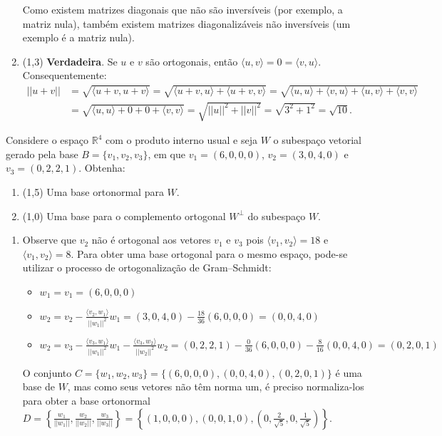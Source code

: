\documentclass[12pt,a4paper]{article}
\newcommand{\norm}[1]{\left|\left|{#1}\right|\right|}
\newcommand*\R{\mathbb{R}}
\begin{document}
\begin{ExerciseList}
\begin{enumerate}
Como existem matrizes diagonais que não são inversíveis (por exemplo, a matriz nula), também existem matrizes diagonalizáveis não inversíveis (um exemplo é a matriz nula).
\item (1,3) \textbf{Verdadeira}. Se $u$ e $v$ são ortogonais, então $\langle u, v \rangle = 0 = \langle v, u \rangle$. Consequentemente:
\begin{align*}
    \norm{u+v}
& = \sqrt{ \langle u+v, u+v \rangle }
  = \sqrt{ \langle u+v, u \rangle + \langle u+v, v \rangle }
  = \sqrt{ \langle u, u \rangle + \langle v, u \rangle
  + \langle u, v \rangle + \langle v, v \rangle } \\
& = \sqrt{ \langle u, u \rangle + 0 + 0 + \langle v, v \rangle }
  = \sqrt{ \norm{u}^2 + \norm{v}^2 }
  = \sqrt{3^2 + 1^2} = \sqrt{10}.
\end{align*}
\end{enumerate}


\Exercise[title={2,5}] Considere o espaço $\R^4$ com o produto interno usual e seja $W$ o subespaço vetorial gerado pela base $B = \{ v_1, v_2, v_3\}$, em que
$v_1 = (6, 0, 0, 0)$,
$v_2 = (3, 0, 4, 0)$ e
$v_3 = (0, 2, 2, 1)$. Obtenha:
\begin{enumerate}
\item (1,5) Uma base ortonormal para $W$.
\item (1,0) Uma base para o complemento ortogonal $W^\perp$ do subespaço $W$.
\end{enumerate}
\Answer
\begin{enumerate}
\item Observe que $v_2$ não é ortogonal aos vetores $v_1$ e $v_3$ pois $\langle v_1, v_2 \rangle = 18$ e $\langle v_1, v_2 \rangle = 8$. Para obter uma base ortogonal para o mesmo espaço, pode-se utilizar o processo de ortogonalização de Gram–Schmidt:
\begin{itemize}
\item $w_1
= v_1
= (6, 0, 0, 0)$
\item $w_2
= v_2 - \frac{\langle v_2, w_1 \rangle}{\norm{w_1}^2}w_1
= (3, 0, 4, 0) - \frac{18}{36}(6, 0, 0, 0)
= (0, 0, 4, 0)$
\item $w_2
= v_3 - \frac{\langle v_3, w_1 \rangle}{\norm{w_1}^2}w_1
      - \frac{\langle v_3, w_2 \rangle}{\norm{w_2}^2}w_2
= (0, 2, 2, 1) - \frac{0}{36}(6, 0, 0, 0)
               - \frac{8}{16}(0, 0, 4, 0)
= (0,2,0,1)$
\end{itemize}
O conjunto $C = \{ w_1, w_2, w_3 \} = \{
(6, 0, 0, 0),  (0, 0, 4, 0), (0, 2, 0, 1)
\}$ é uma base de $W$, mas como seus vetores não têm norma um, é preciso normaliza-los para obter a base ortonormal $D = \left\{ \frac{w_1}{\norm{w_1}}, \frac{w_2}{\norm{w_2}}, \frac{w_3}{\norm{w_3}} \right\} = \left\{
(1, 0, 0, 0),  (0, 0, 1, 0), (0, \frac{2}{\sqrt{5}}, 0, \frac{1}{\sqrt{5}})
\right\}$.



\end{enumerate}
\end{ExerciseList}
\end{document}
